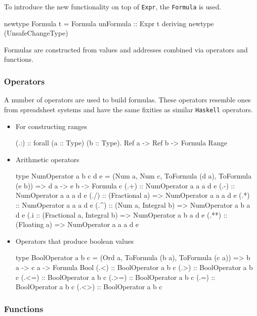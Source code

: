 To introduce the new functionality on top of \texttt{Expr}, the \texttt{Formula} is used.

\begin{mycode}
newtype Formula t = Formula {unFormula :: Expr t}
  deriving newtype (UnsafeChangeType)
\end{mycode}

Formulas are constructed from values and addresses combined via operators and functions.

\subsubsection{Operators}
\label{sec:operators}

A number of operators are used to build formulas.
These operators resemble ones from spreadsheet systems and have the same fixities as similar \texttt{Haskell} operators.

\begin{itemize}
  \item For constructing ranges
  \begin{mycode}
(.:) :: forall (a :: Type) (b :: Type). Ref a -> Ref b -> Formula Range
  \end{mycode}
  \item Arithmetic operators
  \begin{mycode}
type NumOperator a b c d e = (Num a, Num c, ToFormula (d a), ToFormula (e b)) => d a -> e b -> Formula c
(.+) :: NumOperator a a a d e
(.-) :: NumOperator a a a d e
(./) :: (Fractional a) => NumOperator a a a d e
(.*) :: NumOperator a a a d e
(.^) :: (Num a, Integral b) => NumOperator a b a d e
(.^^) :: (Fractional a, Integral b) => NumOperator a b a d e
(.**) :: (Floating a) => NumOperator a a a d e
  \end{mycode}
  \item Operators that produce boolean values
  \begin{mycode}
type BoolOperator a b c = (Ord a, ToFormula (b a), ToFormula (c a)) => b a -> c a -> Formula Bool
(.<) :: BoolOperator a b c
(.>) :: BoolOperator a b c
(.<=) :: BoolOperator a b c
(.>=) :: BoolOperator a b c
(.=) :: BoolOperator a b c
(.<>) :: BoolOperator a b c
  \end{mycode}
\end{itemize}

\subsubsection{Functions}

